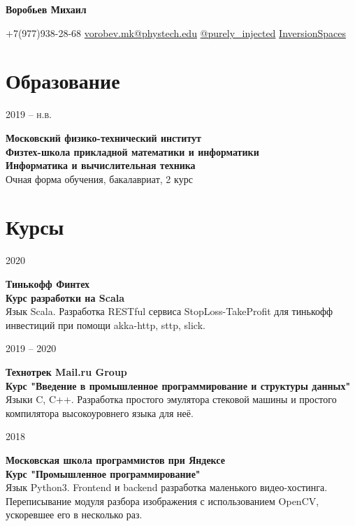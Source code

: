 \documentclass{article}
\makeatletter
\renewcommand{\maketitle}{
    \Huge
    \begin{center}
        \textbf{Воробьев Михаил}
    \end{center}

    \small
    \begin{center}
    \faMobile \hspace{0.1cm} $\boldsymbol{+}$7(977)938-28-68 
    \hfill
    \faEnvelope \hspace{0.1cm} \href{mailto:vorobev.mk@phystech.edu}{vorobev.mk@phystech.edu}
    \hfill
    \faPaperPlane \hspace{0.1cm} \href{https://t.me/purely_injected}{@purely\_injected}
    \hfill
    \faGithub \hspace{0.1cm} \href{https://github.com/InversionSpaces}{InversionSpaces}
    \end{center}
}
\newcommand{\entry}[3]{
    \begin{minipage}[t]{.11\linewidth}
        \hfill \textsc{#1}
    \end{minipage}
    \hfill\vline\hfill
    \begin{minipage}[t]{.80\linewidth}
        \textbf{#2} \\
        \footnotesize{#3}
    \end{minipage}
}
\makeatother
\begin{document}
    \maketitle
    \small
    
    \section{Образование}
        \entry {2019 -- н.в.}
        {Московский физико-технический институт\\
         Физтех-школа прикладной математики и информатики\\
         Информатика и вычислительная техника}
        {Очная форма обучения, бакалавриат, 2 курс}

    \section{Курсы}
        \entry {2020 \\
            }
            {Тинькофф Финтех \\
            Курс разработки на Scala }
            { Язык Scala. Разработка RESTful сервиса StopLoss-TakeProfit для тинькофф инвестиций при помощи akka-http, sttp, slick. }
        
        \vspace{.1cm}
        
        \entry {2019 -- 2020 \\
        }
        {Технотрек Mail.ru Group \\
        Курс "Введение в промышленное программирование и структуры данных"}
        { Языки C, C++. Разработка простого эмулятора стековой машины и простого компилятора высокоуровнего языка для неё. }
          
        \vspace{.1cm}
        
        \entry {2018 \\
        }
        {Московская школа программистов при Яндексе \\
        Курс "Промышленное программирование"}
        { Язык Python3. Frontend и backend разработка маленького видео-хостинга. Переписывание модуля разбора изображения с использованием OpenCV, ускоревшее его в несколько раз. }  
        
\end{document}
